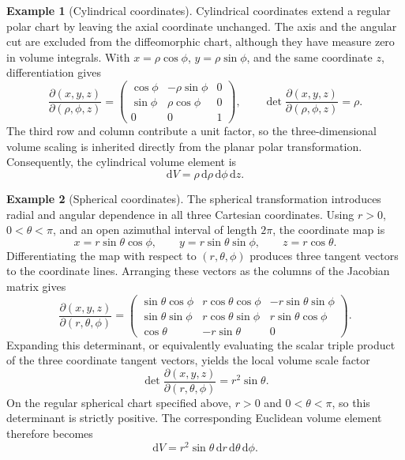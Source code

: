 \documentclass[11pt,a4paper]{article}
\newcommand{\be}{\begin{equation}}
\newcommand{\ee}{\end{equation}}
\newcommand{\lb}[1]{\label{#1}}
\newcommand{\dd}{\mathrm{d}}
\theoremstyle{definition}
\newtheorem{example}{Example}[section]
\numberwithin{equation}{section}
\begin{document}
\begin{example}[Cylindrical coordinates]
Cylindrical coordinates extend a regular polar chart by leaving the axial coordinate unchanged. The axis and the angular cut are excluded from the diffeomorphic chart, although they have measure zero in volume integrals. With $x=\rho\cos\phi$, $y=\rho\sin\phi$, and the same coordinate $z$, differentiation gives
\be
\frac{\partial(x,y,z)}{\partial(\rho,\phi,z)}
=
\begin{pmatrix}
\cos\phi & -\rho\sin\phi & 0\\
\sin\phi & \rho\cos\phi & 0\\
0&0&1
\end{pmatrix},
\qquad
\det\frac{\partial(x,y,z)}{\partial(\rho,\phi,z)}=\rho.
\lb{eq:cylindrical-jacobian}
\ee
The third row and column contribute a unit factor, so the three-dimensional volume scaling is inherited directly from the planar polar transformation. Consequently, the cylindrical volume element is
\be
\dd V=\rho\,\dd\rho\,\dd\phi\,\dd z.
\lb{eq:cylindrical-volume}
\ee
\end{example}

\begin{example}[Spherical coordinates]
The spherical transformation introduces radial and angular dependence in all three Cartesian coordinates. Using $r>0$, $0<\theta<\pi$, and an open azimuthal interval of length $2\pi$, the coordinate map is
\be
x=r\sin\theta\cos\phi,
\qquad
y=r\sin\theta\sin\phi,
\qquad
z=r\cos\theta.
\lb{eq:spherical-map}
\ee
Differentiating the map with respect to $(r,\theta,\phi)$ produces three tangent vectors to the coordinate lines. Arranging these vectors as the columns of the Jacobian matrix gives
\be
\frac{\partial(x,y,z)}{\partial(r,\theta,\phi)}
=
\begin{pmatrix}
\sin\theta\cos\phi & r\cos\theta\cos\phi & -r\sin\theta\sin\phi\\
\sin\theta\sin\phi & r\cos\theta\sin\phi & r\sin\theta\cos\phi\\
\cos\theta & -r\sin\theta & 0
\end{pmatrix}.
\lb{eq:spherical-jacobian-matrix}
\ee
Expanding this determinant, or equivalently evaluating the scalar triple product of the three coordinate tangent vectors, yields the local volume scale factor
\be
\det\frac{\partial(x,y,z)}{\partial(r,\theta,\phi)}
=r^2\sin\theta.
\lb{eq:spherical-jacobian}
\ee
On the regular spherical chart specified above, $r>0$ and $0<\theta<\pi$, so this determinant is strictly positive. The corresponding Euclidean volume element therefore becomes
\be
\dd V=r^2\sin\theta\,\dd r\,\dd\theta\,\dd\phi.
\lb{eq:spherical-volume}
\ee
\end{example}
\end{document}
